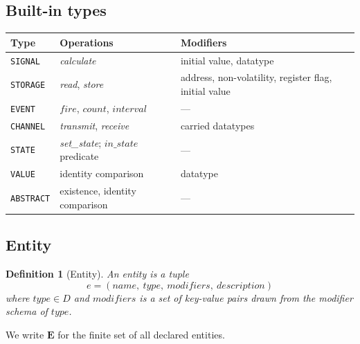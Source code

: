 \documentclass{article}
\newtheorem{definition}{Definition}
\begin{document}
\subsection{Built-in types}

\begin{tabularx}{\textwidth}{lXX}
    \toprule
    \textbf{Type}     & \textbf{Operations}                                    & \textbf{Modifiers}                                    \\
    \midrule
    \texttt{SIGNAL}   & \textit{calculate}                                     & initial value, datatype                               \\
    \texttt{STORAGE}  & \textit{read}, \textit{store}                          & address, non-volatility, register flag, initial value \\
    \texttt{EVENT}    & $\mathit{fire}$, $\mathit{count}$, $\mathit{interval}$ & —                                                     \\
    \texttt{CHANNEL}  & \textit{transmit}, \textit{receive}                    & carried datatypes                                     \\
    \texttt{STATE}    & \textit{set\_state}; $\mathit{in\_state}$ predicate    & —                                                     \\
    \texttt{VALUE}    & identity comparison                                    & datatype                                              \\
    \texttt{ABSTRACT} & existence, identity comparison                         & —                                                     \\
    \bottomrule
\end{tabularx}

\subsection{Entity}

\begin{definition}[Entity]
    An entity is a tuple
    \[
        e = (\mathit{name},\ \mathit{type},\ \mathit{modifiers},\ \mathit{description})
    \]
    where $\mathit{type} \in D$ and $\mathit{modifiers}$ is a set of key-value pairs drawn from the modifier schema of $\mathit{type}$.
\end{definition}

We write $\mathbf{E}$ for the finite set of all declared entities.
\end{document}
